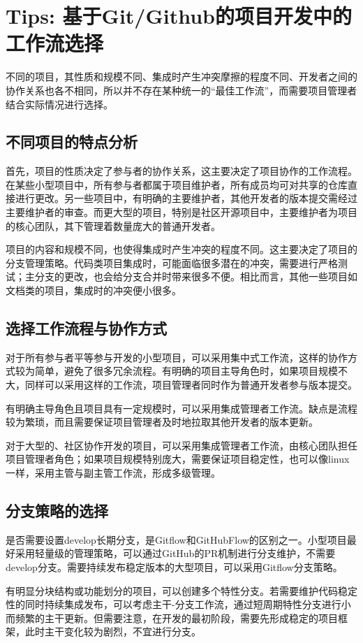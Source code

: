 \documentclass[../main.tex]{subfiles}
\begin{document}
\section{Tips: 基于Git/Github的项目开发中的工作流选择}

不同的项目，其性质和规模不同、集成时产生冲突摩擦的程度不同、开发者之间的协作关系也各不相同，所以并不存在某种统一的“最佳工作流”，而需要项目管理者结合实际情况进行选择。

\subsection{不同项目的特点分析}

首先，项目的性质决定了参与者的协作关系，这主要决定了项目协作的工作流程。在某些小型项目中，所有参与者都属于项目维护者，所有成员均可对共享的仓库直接进行更改。另一些项目中，有明确的主要维护者，其他开发者的版本提交需经过主要维护者的审查。而更大型的项目，特别是社区开源项目中，主要维护者为项目的核心团队，其下管理着数量庞大的普通开发者。

项目的内容和规模不同，也使得集成时产生冲突的程度不同。这主要决定了项目的分支管理策略。代码类项目集成时，可能面临很多潜在的冲突，需要进行严格测试；主分支的更改，也会给分支合并时带来很多不便。相比而言，其他一些项目如文档类的项目，集成时的冲突便小很多。

\subsection{选择工作流程与协作方式}

对于所有参与者平等参与开发的小型项目，可以采用集中式工作流，这样的协作方式较为简单，避免了很多冗余流程。有明确的项目主导角色时，如果项目规模不大，同样可以采用这样的工作流，项目管理者同时作为普通开发者参与版本提交。

有明确主导角色且项目具有一定规模时，可以采用集成管理者工作流。缺点是流程较为繁琐，而且需要保证项目管理者及时地拉取其他开发者的版本更新。

对于大型的、社区协作开发的项目，可以采用集成管理者工作流，由核心团队担任项目管理者角色；如果项目规模特别庞大，需要保证项目稳定性，也可以像linux一样，采用主管与副主管工作流，形成多级管理。

\subsection{分支策略的选择}

是否需要设置develop长期分支，是Gitflow和GitHubFlow的区别之一。小型项目最好采用轻量级的管理策略，可以通过GitHub的PR机制进行分支维护，不需要develop分支。需要持续发布稳定版本的大型项目，可以采用Gitflow分支策略。

有明显分块结构或功能划分的项目，可以创建多个特性分支。若需要维护代码稳定性的同时持续集成发布，可以考虑主干-分支工作流，通过短周期特性分支进行小而频繁的主干更新。但需要注意，在开发的最初阶段，需要先形成稳定的项目框架，此时主干变化较为剧烈，不宜进行分支。
\end{document}

